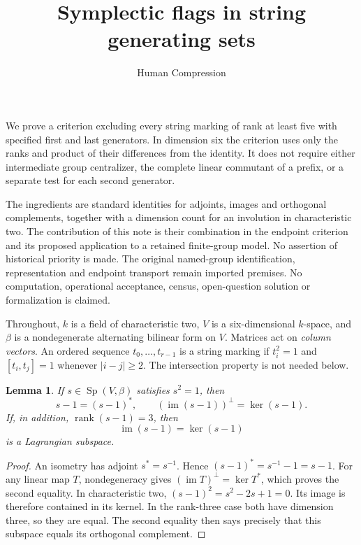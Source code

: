 \documentclass[11pt]{article}
\newtheorem{lemma}[theorem]{Lemma}
\newcommand{\im}{\operatorname{im}}
\newcommand{\Sp}{\operatorname{Sp}}
\begin{document}
\title{Symplectic flags in string generating sets}
\author{Human Compression}
\date{}
\maketitle

We prove a criterion excluding every string marking of rank at least five
with specified first and last generators. In dimension six the criterion
uses only the ranks and product of their differences from the identity.
It does not require either intermediate group centralizer, the complete
linear commutant of a prefix, or a separate test for each second generator.

The ingredients are standard identities for adjoints, images and
orthogonal complements, together with a dimension count for an involution
in characteristic two. The contribution of this note is their combination
in the endpoint criterion and its proposed application to a retained
finite-group model. No assertion of historical priority is made.
The original named-group identification, representation and endpoint
transport remain imported premises. No computation, operational
acceptance, census, open-question solution or formalization is claimed.

Throughout, \(k\) is a field of characteristic two, \(V\) is a
six-dimensional \(k\)-space, and \(\beta\) is a nondegenerate alternating
bilinear form on \(V\). Matrices act on \emph{column vectors}.
An ordered sequence \(t_0,\ldots,t_{r-1}\) is a string marking if
\(t_i^2=1\) and \([t_i,t_j]=1\) whenever \(|i-j|\geq2\).
The intersection property is not needed below.

\begin{lemma}\label{lem:adjoint}
If \(s\in\Sp(V,\beta)\) satisfies \(s^2=1\), then
\[
 s-1=(s-1)^*,\qquad
 (\im(s-1))^\perp=\ker(s-1).
\]
If, in addition, \(\operatorname{rank}(s-1)=3\), then
\[
       \im(s-1)=\ker(s-1)
\]
is a Lagrangian subspace.
\end{lemma}
\begin{proof}
An isometry has adjoint \(s^*=s^{-1}\). Hence
\((s-1)^*=s^{-1}-1=s-1\).
For any linear map \(T\), nondegeneracy gives
\((\im T)^\perp=\ker T^*\), which proves the second equality.
In characteristic two, \((s-1)^2=s^2-2s+1=0\).
Its image is therefore contained in its kernel. In the rank-three case
both have dimension three, so they are equal. The second equality then
says precisely that this subspace equals its orthogonal complement.
\end{proof}
\end{document}
